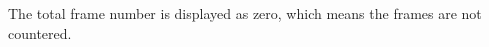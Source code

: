 \documentclass[xcolor={dvipsnames,table},11pt]{beamer}
\begin{document}
\frame{}

\begin{frame}[allowframebreaks]
\begin{thebibliography}{}
\bibitem{} The total frame number is displayed as zero,
\framebreak
\bibitem{} which means the frames are not countered.
\end{thebibliography}
\end{frame}
\end{document}
